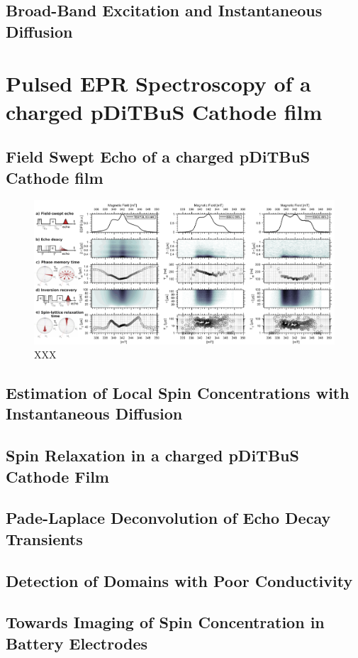 \subsection{Broad-Band Excitation and Instantaneous Diffusion}




\section{Pulsed EPR Spectroscopy of a charged pDiTBuS Cathode film}

\subsection{Field Swept Echo of a charged pDiTBuS Cathode film}
\begin{figure}[h]
\center
	\includegraphics[width=1\textwidth]{./pulse/figures/FSE_DTBS_FSE_RELAX_T1Tm.pdf}
	\caption{XXX}
	\label{fig:Figure_FSE1}
\end{figure}


\subsection{Estimation of Local Spin Concentrations with Instantaneous Diffusion}
\subsection{Spin Relaxation in a charged pDiTBuS Cathode Film}
\subsection{Pade-Laplace Deconvolution of Echo Decay Transients}
\subsection{Detection of Domains with Poor Conductivity}
\subsection{Towards Imaging of Spin Concentration in Battery Electrodes}



